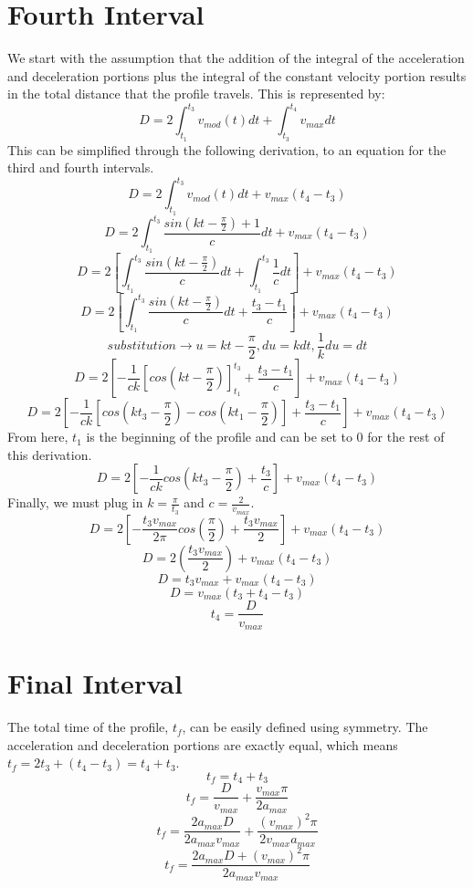 \documentclass[a4paper,12pt]{report}
\newcommand{\tab}{\hspace{20pt}}
\begin{document}
	\section{Fourth Interval}
	\tab We start with the assumption that the addition of the integral of the acceleration and deceleration portions plus the integral of the constant velocity portion results in the total distance that the profile travels. This is represented by:
	\[D = 2\int_{t_1}^{t_3}v_{mod}(t)dt + \int_{t_3}^{t_4}v_{max}dt\]
	\tab This can be simplified through the following derivation, to an equation for the third and fourth intervals.
	\[D = 2\int_{t_1}^{t_3}v_{mod}(t)dt + v_{max}(t_4 - t_3)\]
	\[D = 2\int_{t_1}^{t_3}\frac{sin(kt - \frac{\pi}{2}) + 1}{c}dt + v_{max}(t_4 - t_3)\]
	\[D = 2\left[\int_{t_1}^{t_3}\frac{sin(kt - \frac{\pi}{2})}{c}dt + \int_{t_1}^{t_3}\frac{1}{c}dt\right] + v_{max}(t_4 - t_3)\]
	\[D = 2\left[\int_{t_1}^{t_3}\frac{sin(kt - \frac{\pi}{2})}{c}dt + \frac{t_3 - t_1}{c}\right] + v_{max}(t_4 - t_3)\]
	\[substitution \rightarrow u = kt - \frac{\pi}{2}, du = kdt, \frac{1}{k}du = dt\]
	\[D = 2\left[-\frac{1}{ck}\left[cos(kt - \frac{\pi}{2})\right]_{t_1}^{t_3} + \frac{t_3 - t_1}{c}\right] + v_{max}(t_4 - t_3)\]
	\[D = 2\left[-\frac{1}{ck}\left[cos(kt_3 - \frac{\pi}{2}) - cos(kt_1 - \frac{\pi}{2})\right] + \frac{t_3 - t_1}{c}\right] + v_{max}(t_4 - t_3)\]
	\tab From here, $t_1$ is the beginning of the profile and can be set to 0 for the rest of this derivation.
	\[D = 2\left[-\frac{1}{ck}cos(kt_3 - \frac{\pi}{2}) + \frac{t_3}{c}\right] + v_{max}(t_4 - t_3)\]
	\tab Finally, we must plug in $k = \frac{\pi}{t_3}$ and $c = \frac{2}{v_{max}}$.
	\[D = 2\left[-\frac{t_3v_{max}}{2\pi}cos(\frac{\pi}{2}) + \frac{t_3v_{max}}{2}\right] + v_{max}(t_4 - t_3)\]
	\[D = 2(\frac{t_3v_{max}}{2}) + v_{max}(t_4 - t_3)\]
	\[D = t_3v_{max} + v_{max}(t_4 - t_3)\]
	\[D = v_{max}(t_3 + t_4 - t_3)\]
	\[t_4 = \frac{D}{v_{max}}\]
	
	\section{Final Interval}
	\tab The total time of the profile, $t_f$, can be easily defined using symmetry. The acceleration and deceleration portions are exactly equal, which means $t_f = 2t_3 + (t_4 - t_3) = t_4 + t_3$.
	\[t_f = t_4 + t_3\]
	\[t_f = \frac{D}{v_{max}} + \frac{v_{max}\pi}{2a_{max}}\]
	\[t_f = \frac{2a_{max}D}{2a_{max}v_{max}} + \frac{(v_{max})^2\pi}{2v_{max}a_{max}}\]
	\[t_f = \frac{2a_{max}D + (v_{max})^2\pi}{2a_{max}v_{max}}\]
	
\end{document}
